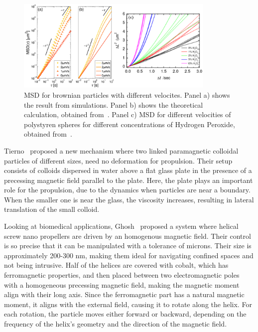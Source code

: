 \begin{figure}[h]
  \begin{center}
    \includegraphics[width=0.85\textwidth]{figures/msdmicroscopicagents.pdf}
  \end{center}
  \caption[MSD for brownian particles]{MSD for brownian particles with different velocites. Panel a) shows the result from simulations. Panel b) shows the theoretical calculation, obtained from~\cite{volpe2014simulation}. Panel c) MSD for different velocities of polystyren spheres for different concentrations of Hydrogen Peroxide, obtained from~\cite{howse2007self}.}\label{fig:msddifferentvelocities}
\end{figure}

Tierno~\cite{tierno2008controlled} proposed a new mechanism where two linked paramagnetic colloidal particles of different sizes, need no deformation for propulsion. Their setup consists of colloids dispersed in water above a flat glass plate in the presence of a precessing magnetic field parallel to the plate. Here, the plate plays an important role for the propulsion, due to the dynamics when particles are near a boundary. When the smaller one is near the glass, the viscosity increases, resulting in lateral translation of the small colloid.


Looking at biomedical applications, Ghosh~\cite{ghosh2009controlled} proposed a system where helical screw nano propellers are driven by an homogenous magnetic field. Their control is so precise that it can be manipulated with a tolerance of microns. Their size is approximately 200-300 nm, making them ideal for navigating confined spaces and not being intrusive. Half of the helices are covered with cobalt, which has ferromagnetic properties, and then placed between two electromagnetic poles with a homogeneous precessing magnetic field, making the magnetic moment align with their long axis. Since the ferromagnetic part has a natural magnetic moment, it aligns with the external field, causing it to rotate along the helix. For each rotation, the particle moves either forward or backward, depending on the frequency of the helix's geometry and the direction of the magnetic field. 

